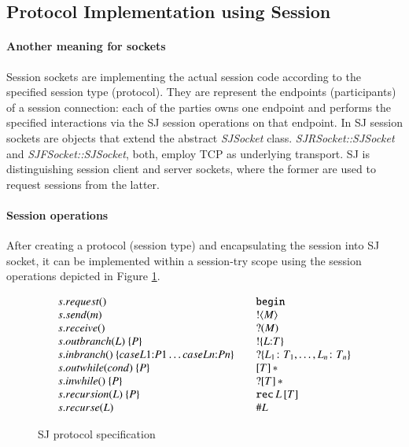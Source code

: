 \documentclass{llncs}
\begin{document}
\subsection{Protocol Implementation using Session}
\paragraph{Another meaning for sockets}
Session sockets are implementing the actual session code according to the specified session type (protocol). They are represent the endpoints (participants) of a session connection: each of the parties owns one endpoint and performs the specified interactions via the SJ session operations on that endpoint. In SJ session sockets are objects that extend the abstract \textit{SJSocket} class. \textit{SJRSocket::SJSocket} and \textit{SJFSocket::SJSocket}, both, employ TCP as underlying transport. SJ is distinguishing session client and server sockets, where the former are used to request sessions from the latter.

\paragraph{Session operations}
After creating a protocol (session type) and encapsulating the session into SJ socket, it can be implemented within a session-try scope using the session operations depicted in Figure \ref{tab:session-ops}.


\begin{figure}
\begin{gather*}
\begin{array}{lrl}
s.request() 	&   		    & \mbox{\texttt{begin}} \\
s.send(m)   	&  	 		& \mathopen{!}\left<M\right> \\
s.receive() 	&  	 		& \mathopen{?}\left(M\right) \\
s.outbranch(L) \ \{P\} &  		& \mathopen{!}\left\{L\mathopen{:} T\right\} \\
s.inbranch() \ \{case L1\mathopen{:} {P1}\dots case Ln\mathopen{:}{Pn}\} &   & \mathopen{?}\left\{L_1\colon 
                                        T_1,\dots, L_n\colon T_n\right\} \\
s.outwhile(cond) \ \{P\} 		&   & \left[T\right]\mathopen{*} \\
s.inwhile() \ \{P\} 		 	&   & \mathopen{?}\left[T\right]\mathopen{*} \\
s.recursion(L) \ \{P\} &   & \texttt{rec}\,L\left[T\right] \\
s.recurse(L) &   & \mathopen{\#}L \\
\end{array}
\end{gather*}
\caption{SJ protocol specification}\label{tab:session-ops} 
\end{figure}
\end{document}
